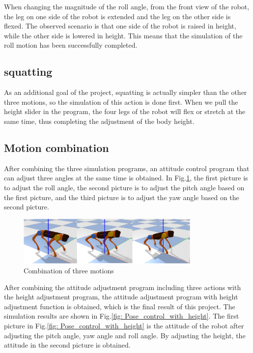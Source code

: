 When changing the magnitude of the roll angle, from the front view of the robot, the leg on one side of the robot is extended and the leg on the other side is flexed. The observed scenario is that one side of the robot is raised in height, while the other side is lowered in height. This means that the simulation of the roll motion has been successfully completed.

\subsection{squatting}

As an additional goal of the project, squatting is actually simpler than the other three motions, so the simulation of this action is done first. When we pull the height slider in the program, the four legs of the robot will flex or stretch at the same time, thus completing the adjustment of the body height.

\subsection{Motion combination}

After combining the three simulation programs, an attitude control program that can adjust three angles at the same time is obtained. In Fig.\ref{fig: Combination_of_three_motions}, the first picture is to adjust the roll angle, the second picture is to adjust the pitch angle based on the first picture, and the third picture is to adjust the yaw angle based on the second picture.

\begin{figure}[htbp]
   \centering
   \includegraphics[width=0.8\textwidth]{figures/Combination_of_three_motions.png}
   \caption{Combination of three motions}
   \label{fig: Combination_of_three_motions}
\end{figure}

After combining the attitude adjustment program including three actions with the height adjustment program, the attitude adjustment program with height adjustment function is obtained, which is the final result of this project. The simulation results are shown in Fig.\ref{fig: Pose_control_with_height}. The first picture in Fig.\ref{fig: Pose_control_with_height} is the attitude of the robot after adjusting the pitch angle, yaw angle and roll angle. By adjusting the height, the attitude in the second picture is obtained.

